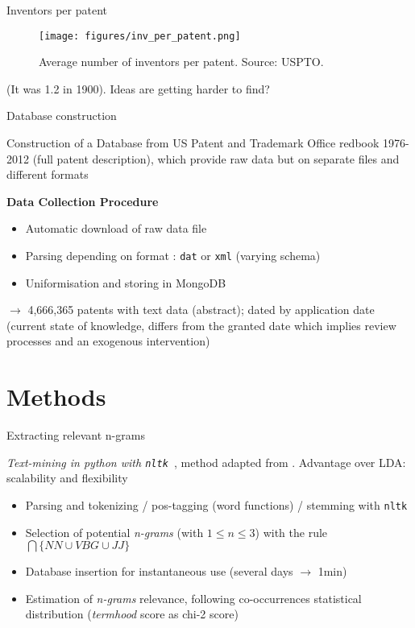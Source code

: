 \documentclass{beamer}
\begin{document}
\begin{frame}{Inventors per patent}
    \begin{figure}
        \centering
        \texttt{[image: figures/inv\_per\_patent.png]}
        \caption{Average number of inventors per patent. Source: USPTO.}
    \end{figure}
    
    (It was 1.2 in 1900). Ideas are getting harder to find?
\end{frame}
    
\begin{frame}{Database construction}
    
Construction of a Database from US Patent and Trademark Office redbook 1976-2012 (full patent description), which provide raw data but on separate files and different formats

\bigskip

\textbf{Data Collection Procedure}

\begin{itemize}
\item Automatic download of raw data file
\item Parsing depending on format : \texttt{dat} or \texttt{xml} (varying schema)
\item Uniformisation and storing in MongoDB
\end{itemize}

\bigskip

$\rightarrow$ 4,666,365 patents with text data (abstract); dated by application date (current state of knowledge, differs from the granted date which implies review processes and an exogenous intervention)

\end{frame}
\section{Methods}
\begin{frame}{Extracting relevant n-grams}
    
    
    \textit{Text-mining in python with \texttt{nltk}~\cite{bird2006nltk}}, method adapted from
\cite{chavalarias2013phylomemetic}. Advantage over LDA: scalability and flexibility

   

\bigskip

\begin{itemize}
\item Parsing and tokenizing / pos-tagging (word functions) / stemming  with \texttt{nltk}
\item Selection of potential \textit{n-grams} (with $1 \leq n \leq 3$) with the rule $\bigcap \{NN \cup VBG \cup JJ \}$
\item Database insertion for instantaneous use (several days $\rightarrow$ 1min)
\item Estimation of \textit{n-grams} relevance, following co-occurrences statistical distribution (\textit{termhood} score as chi-2 score)
\end{itemize}
\end{frame}
\end{document}
